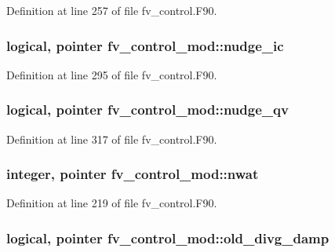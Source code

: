 Definition at line 257 of file fv\-\_\-control.\-F90.

\subsubsection[{nudge\-\_\-ic}]{\setlength{\rightskip}{0pt plus 5cm}logical, pointer fv\-\_\-control\-\_\-mod\-::nudge\-\_\-ic\hspace{0.3cm}{\ttfamily [private]}}\label{classfv__control__mod_acf381938c799f3bf387b28c9a5d2e06c}


Definition at line 295 of file fv\-\_\-control.\-F90.

\subsubsection[{nudge\-\_\-qv}]{\setlength{\rightskip}{0pt plus 5cm}logical, pointer fv\-\_\-control\-\_\-mod\-::nudge\-\_\-qv\hspace{0.3cm}{\ttfamily [private]}}\label{classfv__control__mod_ad7e3b542651cf836a315dcf36149256d}


Definition at line 317 of file fv\-\_\-control.\-F90.

\subsubsection[{nwat}]{\setlength{\rightskip}{0pt plus 5cm}integer, pointer fv\-\_\-control\-\_\-mod\-::nwat\hspace{0.3cm}{\ttfamily [private]}}\label{classfv__control__mod_acedcdd0be0664497b28861c69b006c40}


Definition at line 219 of file fv\-\_\-control.\-F90.

\subsubsection[{old\-\_\-divg\-\_\-damp}]{\setlength{\rightskip}{0pt plus 5cm}logical, pointer fv\-\_\-control\-\_\-mod\-::old\-\_\-divg\-\_\-damp\hspace{0.3cm}{\ttfamily [private]}}\label{classfv__control__mod_a32a2ea4bdec1e069f6461fb5b1471d93}


